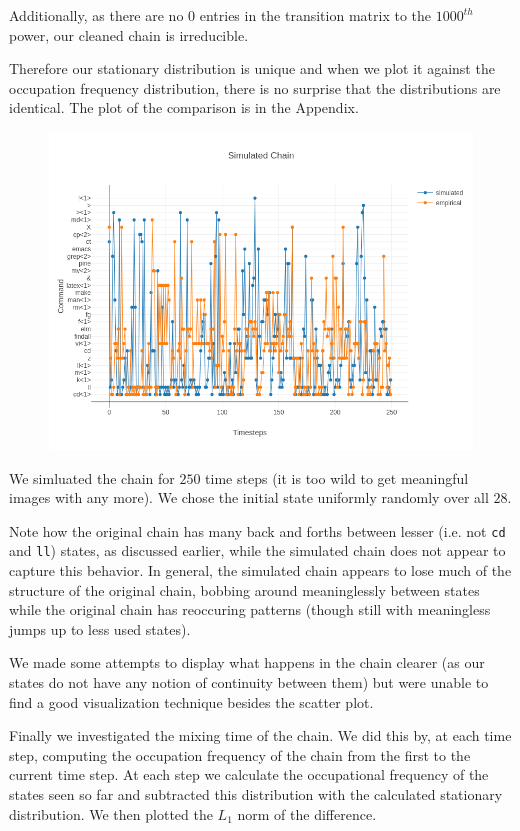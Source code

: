 \documentclass[10pt]{article}
\begin{document}
Additionally, as there are no $0$ entries in the transition matrix to the $1000^{th}$ power, our cleaned chain is irreducible.

Therefore our stationary distribution is unique and when we plot it
against the occupation frequency distribution, there is no surprise that the
distributions are identical. The plot of the comparison is in the Appendix.

\begin{figure}[!htb]
  \centering
  \includegraphics[scale=.55]{../pictures/simul-chain-vs-empirical-chain.png}
\end{figure}

We simluated the chain for $250$ time steps (it is too wild to get meaningful images with any more).
We chose the initial state uniformly randomly over all $28$.

Note how the original chain has many back and forths between lesser (i.e. not \texttt{cd} and \texttt{ll}) states, as discussed earlier,
while the simulated chain does not appear to capture this behavior.
In general, the simulated chain appears to lose much of the structure of the original chain,
bobbing around meaninglessly between states while the original chain has reoccuring patterns (though still with meaningless jumps up to less used states).

We made some attempts to display what happens in the chain clearer (as our states do not have any notion of continuity between them) but were unable to find a good visualization technique besides the scatter plot.

Finally we investigated the mixing time of the chain. We did this by, at each
time step, computing the occupation frequency of the chain from the first to the
current time step. At each step we calculate the occupational frequency of the
states seen so far and subtracted this distribution with the calculated
stationary distribution. We then plotted the $L_1$ norm of the difference.
\end{document}
